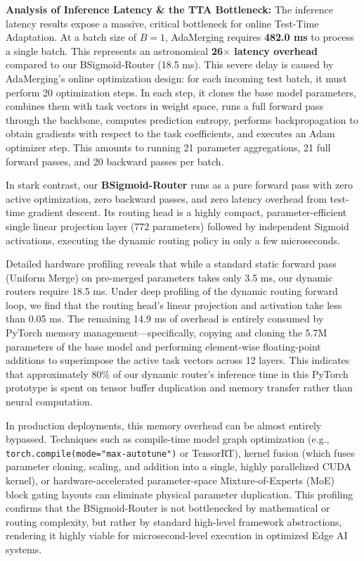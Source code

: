 \documentclass{article}
\theoremstyle{plain}
\theoremstyle{definition}
\theoremstyle{remark}
\begin{document}
\textbf{Analysis of Inference Latency \& the TTA Bottleneck:}
The inference latency results expose a massive, critical bottleneck for online Test-Time Adaptation. At a batch size of $B=1$, AdaMerging requires \textbf{482.0 ms} to process a single batch. This represents an astronomical \textbf{26$\times$ latency overhead} compared to our BSigmoid-Router (18.5 ms). 
This severe delay is caused by AdaMerging's online optimization design: for each incoming test batch, it must perform 20 optimization steps. In each step, it clones the base model parameters, combines them with task vectors in weight space, runs a full forward pass through the backbone, computes prediction entropy, performs backpropagation to obtain gradients with respect to the task coefficients, and executes an Adam optimizer step. This amounts to running 21 parameter aggregations, 21 full forward passes, and 20 backward passes per batch. 

In stark contrast, our \textbf{BSigmoid-Router} runs as a pure forward pass with zero active optimization, zero backward passes, and zero latency overhead from test-time gradient descent. Its routing head is a highly compact, parameter-efficient single linear projection layer (772 parameters) followed by independent Sigmoid activations, executing the dynamic routing policy in only a few microseconds. 

Detailed hardware profiling reveals that while a standard static forward pass (Uniform Merge) on pre-merged parameters takes only 3.5 ms, our dynamic routers require 18.5 ms. Under deep profiling of the dynamic routing forward loop, we find that the routing head's linear projection and activation take less than 0.05 ms. The remaining 14.9 ms of overhead is entirely consumed by PyTorch memory management—specifically, copying and cloning the 5.7M parameters of the base model and performing element-wise floating-point additions to superimpose the active task vectors across 12 layers. This indicates that approximately 80\% of our dynamic router's inference time in this PyTorch prototype is spent on tensor buffer duplication and memory transfer rather than neural computation.

In production deployments, this memory overhead can be almost entirely bypassed. Techniques such as compile-time model graph optimization (e.g., \texttt{torch.compile(mode="max-autotune")} or TensorRT), kernel fusion (which fuses parameter cloning, scaling, and addition into a single, highly parallelized CUDA kernel), or hardware-accelerated parameter-space Mixture-of-Experts (MoE) block gating layouts can eliminate physical parameter duplication. This profiling confirms that the BSigmoid-Router is not bottlenecked by mathematical or routing complexity, but rather by standard high-level framework abstractions, rendering it highly viable for microsecond-level execution in optimized Edge AI systems.

\end{document}
